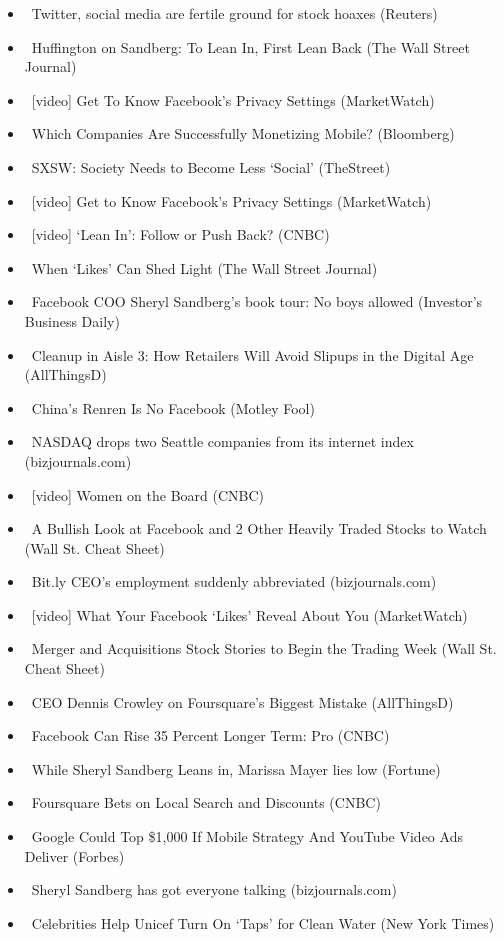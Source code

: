 \documentclass[11pt,asymmetric]{article}
\begin{document}
\begin{itemize}
\item\ Twitter, social media are fertile ground for stock hoaxes (Reuters)
\item\ Huffington on Sandberg: To Lean In, First Lean Back (The Wall Street Journal)
\item\ [video] Get To Know Facebook's Privacy Settings (MarketWatch)
\item\ Which Companies Are Successfully Monetizing Mobile? (Bloomberg)
\item\ SXSW: Society Needs to Become Less `Social' (TheStreet)
\item\ [video] Get to Know Facebook's Privacy Settings (MarketWatch)
\item\ [video] `Lean In': Follow or Push Back? (CNBC)
\item\ When `Likes' Can Shed Light (The Wall Street Journal)
\item\ Facebook COO Sheryl Sandberg's book tour: No boys allowed (Investor's Business Daily)
\item\ Cleanup in Aisle 3: How Retailers Will Avoid Slipups in the Digital Age (AllThingsD)
\item\ China's Renren Is No Facebook (Motley Fool)
\item\ NASDAQ drops two Seattle companies from its internet index (bizjournals.com)
\item\ [video] Women on the Board (CNBC)
\item\ A Bullish Look at Facebook and 2 Other Heavily Traded Stocks to Watch (Wall St. Cheat Sheet)
\item\ Bit.ly CEO's employment suddenly abbreviated (bizjournals.com)
\item\ [video] What Your Facebook `Likes' Reveal About You (MarketWatch)
\item\ Merger and Acquisitions Stock Stories to Begin the Trading Week (Wall St. Cheat Sheet)
\item\ CEO Dennis Crowley on Foursquare's Biggest Mistake (AllThingsD)
\item\ Facebook Can Rise 35 Percent Longer Term: Pro (CNBC)
\item\ While Sheryl Sandberg Leans in, Marissa Mayer lies low (Fortune)
\item\ Foursquare Bets on Local Search and Discounts (CNBC)
\item\ Google Could Top \$1,000 If Mobile Strategy And YouTube Video Ads Deliver (Forbes)
\item\ Sheryl Sandberg has got everyone talking (bizjournals.com)
\item\ Celebrities Help Unicef Turn On ‘Taps’ for Clean Water (New York Times)

\end{itemize}
\end{document}
